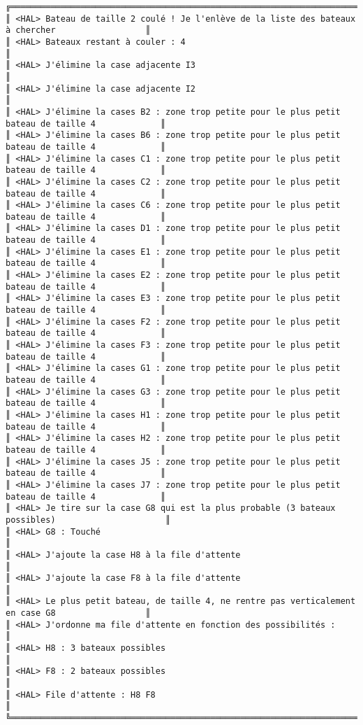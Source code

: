 {\begin{verbatim}
╔══════════════════════════════════════════════════════════════════════════════════════════════════╗
║ <HAL> Bateau de taille 2 coulé ! Je l'enlève de la liste des bateaux à chercher                  ║
║ <HAL> Bateaux restant à couler : 4                                                               ║
║ <HAL> J'élimine la case adjacente I3                                                             ║
║ <HAL> J'élimine la case adjacente I2                                                             ║
║ <HAL> J'élimine la cases B2 : zone trop petite pour le plus petit bateau de taille 4             ║
║ <HAL> J'élimine la cases B6 : zone trop petite pour le plus petit bateau de taille 4             ║
║ <HAL> J'élimine la cases C1 : zone trop petite pour le plus petit bateau de taille 4             ║
║ <HAL> J'élimine la cases C2 : zone trop petite pour le plus petit bateau de taille 4             ║
║ <HAL> J'élimine la cases C6 : zone trop petite pour le plus petit bateau de taille 4             ║
║ <HAL> J'élimine la cases D1 : zone trop petite pour le plus petit bateau de taille 4             ║
║ <HAL> J'élimine la cases E1 : zone trop petite pour le plus petit bateau de taille 4             ║
║ <HAL> J'élimine la cases E2 : zone trop petite pour le plus petit bateau de taille 4             ║
║ <HAL> J'élimine la cases E3 : zone trop petite pour le plus petit bateau de taille 4             ║
║ <HAL> J'élimine la cases F2 : zone trop petite pour le plus petit bateau de taille 4             ║
║ <HAL> J'élimine la cases F3 : zone trop petite pour le plus petit bateau de taille 4             ║
║ <HAL> J'élimine la cases G1 : zone trop petite pour le plus petit bateau de taille 4             ║
║ <HAL> J'élimine la cases G3 : zone trop petite pour le plus petit bateau de taille 4             ║
║ <HAL> J'élimine la cases H1 : zone trop petite pour le plus petit bateau de taille 4             ║
║ <HAL> J'élimine la cases H2 : zone trop petite pour le plus petit bateau de taille 4             ║
║ <HAL> J'élimine la cases J5 : zone trop petite pour le plus petit bateau de taille 4             ║
║ <HAL> J'élimine la cases J7 : zone trop petite pour le plus petit bateau de taille 4             ║
║ <HAL> Je tire sur la case G8 qui est la plus probable (3 bateaux possibles)                      ║
║ <HAL> G8 : Touché                                                                                ║
║ <HAL> J'ajoute la case H8 à la file d'attente                                                    ║
║ <HAL> J'ajoute la case F8 à la file d'attente                                                    ║
║ <HAL> Le plus petit bateau, de taille 4, ne rentre pas verticalement en case G8                  ║
║ <HAL> J'ordonne ma file d'attente en fonction des possibilités :                                 ║
║ <HAL> H8 : 3 bateaux possibles                                                                   ║
║ <HAL> F8 : 2 bateaux possibles                                                                   ║
║ <HAL> File d'attente : H8 F8                                                                     ║
╚══════════════════════════════════════════════════════════════════════════════════════════════════╝
\end{verbatim}}
\newpage


